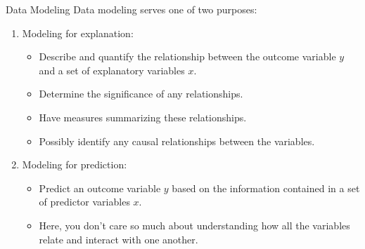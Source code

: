 \documentclass[
  ignorenonframetext,
]{beamer}
\providecommand{\tightlist}{%
  \setlength{\itemsep}{0pt}\setlength{\parskip}{0pt}}
\begin{document}
\begin{frame}{Data Modeling}
\label{data-modeling}
Data modeling serves one of two purposes:

\begin{enumerate}
\item
  Modeling for explanation:

  \begin{itemize}
  \tightlist
  \item
    Describe and quantify the relationship between the outcome variable
    \(y\) and a set of explanatory variables \(x\).
  \item
    Determine the significance of any relationships.
  \item
    Have measures summarizing these relationships.
  \item
    Possibly identify any causal relationships between the variables.
  \end{itemize}
\item
  Modeling for prediction:

  \begin{itemize}
  \tightlist
  \item
    Predict an outcome variable \(y\) based on the information contained
    in a set of predictor variables \(x\).
  \item
    Here, you don't care so much about understanding how all the
    variables relate and interact with one another.
  \end{itemize}
\end{enumerate}
\end{frame}
\end{document}

